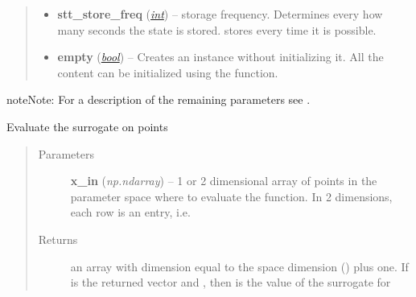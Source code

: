 \documentclass[a4paper,10pt,english]{sphinxmanual}
\begin{document}
\begin{fulllineitems}
\begin{quote}
\begin{description}
\begin{itemize}
\item {} 
\textbf{stt\_store\_freq} (\href{http://docs.python.org/library/functions.html\#int}{\emph{int}}) -- storage frequency. Determines every how many seconds the state is stored.  stores every time it is possible.

\item {} 
\textbf{empty} (\href{http://docs.python.org/library/functions.html\#bool}{\emph{bool}}) -- Creates an instance without initializing it. All the content can be initialized using the  function.

\end{itemize}

\end{description}\end{quote}

\begin{notice}{note}{Note:}
For a description of the remaining parameters see .
\end{notice}

\begin{fulllineitems}
\label{api-stt:TensorToolbox.STT.__getitem__}
\end{fulllineitems}


\begin{fulllineitems}
\label{api-stt:TensorToolbox.STT.__call__}
Evaluate the surrogate on points 
\begin{quote}\begin{description}
\item[{Parameters}] \leavevmode
\textbf{x\_in} (\emph{np.ndarray}) -- 1 or 2 dimensional array of points in the parameter space where to evaluate the function. In 2 dimensions, each row is an entry, i.e. 

\item[{Returns}] \leavevmode
an array with dimension equal to the space dimension () plus one. If  is the returned vector and , then  is the value of the surrogate for 

\end{description}\end{quote}


\end{fulllineitems}
\end{fulllineitems}
\end{document}
